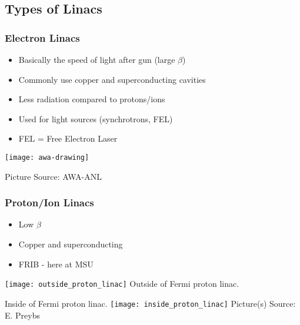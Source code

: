 \documentclass[professionalfonts,t]{beamer}
\begin{document}
\subsection{Types of Linacs}
\begin{frame}[containsverbatim]
\frametitle{Electron Linacs}
\begin{itemize}
	\item Basically the speed of light after gun (large $\beta$)
	\item Commonly use copper and superconducting cavities
	\item Less radiation compared to protons/ions
	\item Used for light sources (synchrotrons, FEL)
	\item FEL = Free Electron Laser
\end{itemize}

\texttt{[image: awa-drawing]}

\hfill Picture Source: AWA-ANL
\end{frame}


\begin{frame}
	\frametitle{Proton/Ion Linacs}

\begin{minipage}{0.45\textwidth}
	\begin{itemize}
		\item Low $\beta$
		\item Copper and superconducting
		\item FRIB - here at MSU
	\end{itemize}
	\centering

	\texttt{[image: outside\_proton\_linac]}
	Outside of Fermi proton linac.
\end{minipage}\hfill
\begin{minipage}{0.45\textwidth}
	\vspace{-1em}
	\centering
	Inside of Fermi proton linac.
	\texttt{[image: inside\_proton\_linac]}
	Picture(s) Source: E. Preybs
\end{minipage}
\end{frame}


\end{document}
